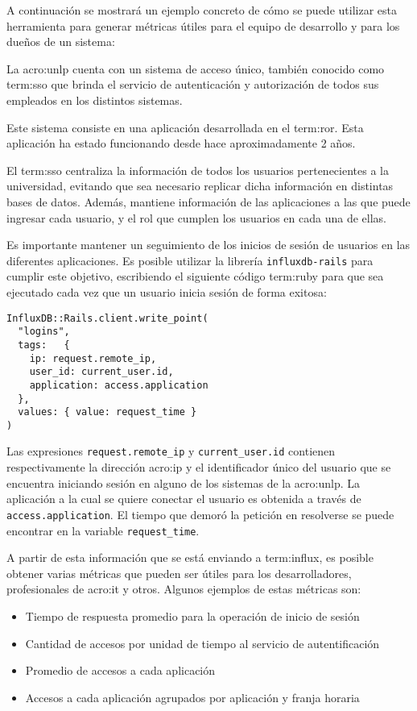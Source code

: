 A continuación se mostrará un ejemplo concreto de cómo se puede utilizar esta
herramienta para generar métricas útiles para el equipo de desarrollo y para
los dueños de un sistema:

La \gls{acro:unlp} cuenta con un sistema de acceso único, también conocido como
\gls{term:sso} que brinda el servicio de autenticación y autorización de todos
sus empleados en los distintos sistemas.

Este sistema consiste en una aplicación desarrollada en el 
\gls{term:ror}. Esta aplicación ha estado funcionando desde hace
aproximadamente 2 años.

El \gls{term:sso} centraliza la información de todos los usuarios
pertenecientes a la universidad, evitando que sea necesario replicar dicha
información en distintas bases de datos. Además, mantiene información de las
aplicaciones a las que puede ingresar cada usuario, y el rol que cumplen los
usuarios en cada una de ellas.

Es importante mantener un seguimiento de los inicios de sesión de usuarios en
las diferentes aplicaciones. Es posible utilizar la librería
\texttt{influxdb-rails} para cumplir este objetivo, escribiendo el siguiente
código \gls{term:ruby} para que sea ejecutado cada vez que un usuario inicia
sesión de forma exitosa:

\begin{lstlisting}
InfluxDB::Rails.client.write_point(
  "logins",
  tags:   { 
    ip: request.remote_ip,
    user_id: current_user.id,
    application: access.application
  },
  values: { value: request_time }
)
\end{lstlisting}

Las expresiones \lstinline{request.remote_ip} y \lstinline{current_user.id}
contienen respectivamente la dirección \gls{acro:ip} y el identificador único
del usuario que se encuentra iniciando sesión en alguno de los sistemas de la
\gls{acro:unlp}. La aplicación a la cual se quiere conectar el usuario es
obtenida a través de \lstinline{access.application}. El tiempo que demoró la
petición  en resolverse se puede encontrar en la variable
\lstinline{request_time}.

A partir de esta información que se está enviando a \gls{term:influx}, es
posible obtener varias métricas que pueden ser útiles para los desarrolladores,
profesionales de \gls{acro:it} y otros. Algunos ejemplos de estas métricas son:

\begin{itemize}
  \item Tiempo de respuesta promedio para la operación de inicio de sesión
  \item Cantidad de accesos por unidad de tiempo al servicio de autentificación
  \item Promedio de accesos a cada aplicación
  \item Accesos a cada aplicación agrupados por aplicación y franja horaria
\end{itemize}

